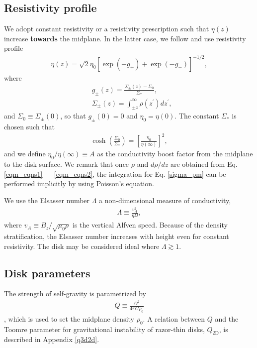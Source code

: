 \subsection{Resistivity profile}\label{resis_profile}
We adopt constant resistivity or a 
resistivity prescription such that $\eta(z)$ increase {\bf towards} the
midplane. In the latter case, we follow \cite{fleming03} and use 
resistivity profile 
\begin{align}
  \eta(z) =
  \sqrt{2}\eta_0\left[\exp{\left(-g_+\right)}+\exp{\left(-g_-\right)}\right]^{-1/2},  
\end{align}
where
\begin{align}
  &g_\pm(z) =  \frac{\Sigma_\pm(z)-\Sigma_0}{\Sigma_*}, \\
  &\Sigma_\pm(z) = \int_{\pm z}^\infty\rho(z^\prime)dz^\prime, \label{sigma_pm}
\end{align}
and $\Sigma_0\equiv\Sigma_{\pm}(0)$, so that $g_\pm(0)=0$ and $\eta_0 
= \eta(0)$. The constant $\Sigma_*$ is chosen such that 
\begin{align}
  \cosh{\left(\frac{\Sigma_0}{\Sigma_*}\right)} =
  \left[\frac{\eta_0}{\eta(\infty)}\right]^2,
\end{align}
and we define $\eta_0/\eta(\infty)\equiv A$ as the conductivity 
boost factor from the midplane to the disk surface. We remark that
once $\rho$ and $d\rho/dz$ are obtained from
Eq. \ref{eqm_eqns1} --- \ref{eqm_eqns2}, the integration for
Eq. \ref{sigma_pm} can be performed implicitly by using Poisson's 
equation. 

We use the Elsasser number $\Lambda$ a non-dimensional measure of
conductivity,
\begin{align} 
  \Lambda \equiv \frac{v_A^2}{\eta\Omega},
\end{align}
where $v_A \equiv B_z/\sqrt{\mu_0\rho}$ is the vertical Alfven speed. 
Because of the density stratification, the Elsasser number 
increases with height even for constant resistivity. The disk may be
considered ideal where $\Lambda \gtrsim 1$. 


\subsection{Disk parameters}
The strength of self-gravity is
parametrized by 
\begin{align}
  Q \equiv \frac{\Omega^2}{4\pi G\rho_0}
\end{align}
\citep{mamat10}, which is used to set the midplane density $\rho_0$. 
A relation between $Q$ and the Toomre parameter for gravitational
instability of razor-thin disks, $Q_\mathrm{2D}$, is described in
Appendix \ref{q3d2d}.  

